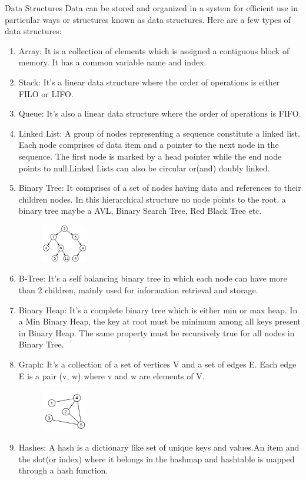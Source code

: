 \documentclass[11pt]{article}
\begin{document}
\begin{section}{Data Structures}
Data can be stored and organized in a system for efficient use in particular ways or structures known as data structures. Here are a few types of data structures:
\begin{enumerate}
\item Array: It is a collection of elements which is assigned a contiguous block of memory. It has a common variable name and index.
\item Stack: It's a linear data structure where the order of operations is either FILO or LIFO.
\item Queue: It's also a linear data structure where the order of operations is FIFO.
\item Linked List: A group of nodes representing a sequence constitute a linked list. Each node comprises of data item and a pointer to the next node in the sequence. The first node is marked by a head pointer while the end node points to null.Linked Lists can also be circular or(and) doubly linked.
\item Binary Tree: It comprises of a set of nodes having data and references to their children nodes. In this hierarchical structure no node points to the root. a binary tree maybe a AVL, Binary Search Tree, Red Black Tree etc. 
\begin{figure}[ht!]
\centering
\includegraphics[width=20mm,scale=0.4]{bt.png}
\end{figure}
\item B-Tree: It's a self balancing binary tree in which each node can have more than 2 children, mainly used for information retrieval and storage.
\item Binary Heap: It's a complete binary tree which is either min or max heap. In a Min Binary Heap, the key at root must be minimum among all keys present in Binary Heap. The same property must be recursively true for all nodes in Binary Tree.
\item Graph: It’s a collection of a set of vertices V and a set of edges E. Each edge E is a pair (v, w) where v and w are elements of V.
\begin{figure}[ht!]
\centering
\includegraphics[width=20mm,scale=0.4]{graph.png}
\end{figure}
\item Hashes: A hash is a dictionary like set of unique keys and values.An item and the slot(or index) where it belongs in the hashmap and hashtable is mapped through a hash function.
\end{enumerate}
\end{section}
\end{document}
